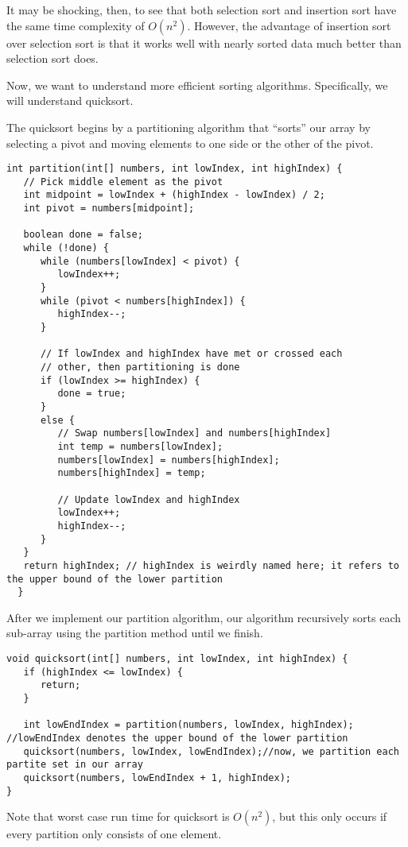 \documentclass[10pt]{mypackage}
\begin{document}
  It may be shocking, then, to see that both selection sort and insertion sort have the same time complexity of $O\left(n^2\right)$. However, the advantage of insertion sort over selection sort is that it works well with nearly sorted data much better than selection sort does.\newline
  
  Now, we want to understand more efficient sorting algorithms. Specifically, we will understand quicksort.\newline

  The quicksort begins by a partitioning algorithm that ``sorts'' our array by selecting a pivot and moving elements to one side or the other of the pivot.
  \begin{lstlisting}[style=javastyle,title=Partition Algorithm]
  int partition(int[] numbers, int lowIndex, int highIndex) {
   // Pick middle element as the pivot
   int midpoint = lowIndex + (highIndex - lowIndex) / 2;
   int pivot = numbers[midpoint];

   boolean done = false;
   while (!done) {
      while (numbers[lowIndex] < pivot) {
         lowIndex++;
      }
      while (pivot < numbers[highIndex]) {
         highIndex--;
      }
 
      // If lowIndex and highIndex have met or crossed each
      // other, then partitioning is done
      if (lowIndex >= highIndex) {
         done = true;
      }
      else {
         // Swap numbers[lowIndex] and numbers[highIndex]
         int temp = numbers[lowIndex];
         numbers[lowIndex] = numbers[highIndex];
         numbers[highIndex] = temp;
       
         // Update lowIndex and highIndex
         lowIndex++;
         highIndex--;
      }
   }
   return highIndex; // highIndex is weirdly named here; it refers to the upper bound of the lower partition
  }
  \end{lstlisting}
  After we implement our partition algorithm, our algorithm recursively sorts each sub-array using the partition method until we finish.
  \begin{lstlisting}[style=javastyle,title=Quicksort Algorithm]
  void quicksort(int[] numbers, int lowIndex, int highIndex) {
   if (highIndex <= lowIndex) {
      return;
   }

   int lowEndIndex = partition(numbers, lowIndex, highIndex); //lowEndIndex denotes the upper bound of the lower partition
   quicksort(numbers, lowIndex, lowEndIndex);//now, we partition each partite set in our array
   quicksort(numbers, lowEndIndex + 1, highIndex);
}
  \end{lstlisting}
  Note that worst case run time for quicksort is $O\left(n^2\right)$, but this only occurs if every partition only consists of one element.
\end{document}
